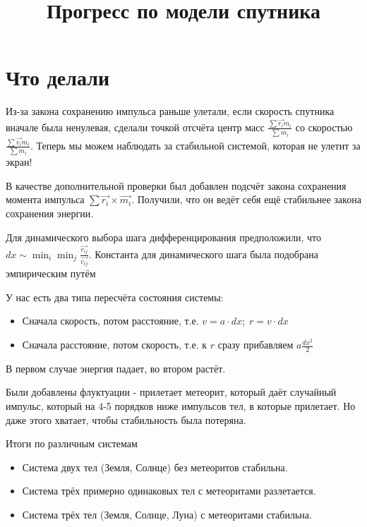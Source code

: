 \documentclass{beamer}
\title{Прогресс по модели спутника}
\begin{document}
\begin{frame}
  \titlepage
\end{frame}

\section{Что делали}

\begin{frame}
    Из-за закона сохранению импульса раньше улетали, если скорость спутника вначале была ненулевая, сделали точкой отсчёта центр масс $\frac{\sum \vec{r_i} m_i}{\sum m_i}$ со скоростью $\frac{\sum \vec{v_i} m_i}{\sum m_i}$. Теперь мы можем наблюдать за стабильной системой, которая не улетит за экран!
\end{frame}

\begin{frame}
    В качестве дополнительной проверки был добавлен подсчёт закона сохранения момента импульса $\sum \vec{r_i} \times \vec{m_i}$. Получили, что он ведёт себя ещё стабильнее закона сохранения энергии.
\end{frame}

 \begin{frame}
    Для динамического выбора шага дифференцирования предположили, что $dx \sim \min_i \min_j \frac{ \vec{r_{ij}}}{ \vec{v_{ij}}}$. Константа для динамического шага была подобрана эмпирическим путём
 \end{frame}

\begin{frame}
    У нас есть два типа пересчёта состояния системы:

    \begin{itemize}
        \item Сначала скорость, потом расстояние, т.е. $v = a \cdot dx;\; r = v \cdot dx$
        \item Сначала расстояние, потом скорость, т.е. к $r$ сразу прибавляем $a\frac{dx^2}{2}$
    \end{itemize}

    В первом случае энергия падает, во втором растёт.
\end{frame}

\begin{frame}
    Были добавлены флуктуации - прилетает метеорит, который даёт случайный импульс, который на 4-5 порядков ниже импульсов тел, в которые прилетает. Но даже этого хватает, чтобы стабильность была потеряна.
\end{frame}

 \begin{frame}
    Итоги по различным системам

    \begin{itemize}
        \item<1-> Система двух тел (Земля, Солнце) без метеоритов стабильна.
        \item<2-> Система трёх примерно одинаковых тел с метеоритами разлетается.
        \item<3-> Система трёх тел (Земля, Солнце, Луна) с метеоритами стабильна.
    \end{itemize}
 \end{frame}
\end{document}
